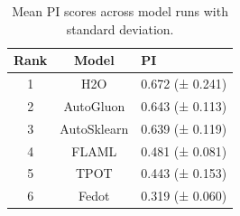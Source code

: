 \begin{table}
\caption{Mean PI scores across model runs with standard deviation.}
\label{tab:pi_scores}
\begin{tabular}{ccl}
\toprule
Rank & Model & PI \\
\midrule
1 & H2O & 0.672 (± 0.241) \\
2 & AutoGluon & 0.643 (± 0.113) \\
3 & AutoSklearn & 0.639 (± 0.119) \\
4 & FLAML & 0.481 (± 0.081) \\
5 & TPOT & 0.443 (± 0.153) \\
6 & Fedot & 0.319 (± 0.060) \\
\bottomrule
\end{tabular}
\end{table}
